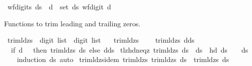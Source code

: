 \begin{isabellebody}
\ {\isachardoublequoteopen}wf{\isacharunderscore}{\kern0pt}digits\ ds\ {\isasymlongleftrightarrow}\ {\isacharparenleft}{\kern0pt}{\isasymforall}d\ {\isasymin}\ set\ ds{\isachardot}{\kern0pt}\ wf{\isacharunderscore}{\kern0pt}digit\ d{\isacharparenright}{\kern0pt}{\isachardoublequoteclose}%
\begin{isamarkuptext}%
Functions to trim leading and trailing zeros.%
\end{isamarkuptext}\isamarkuptrue%
\isamarkupfalse%
\ trim{\isacharunderscore}{\kern0pt}ld{\isacharunderscore}{\kern0pt}zs\ {\isacharcolon}{\kern0pt}{\isacharcolon}{\kern0pt}\ {\isachardoublequoteopen}digit\ list\ {\isasymRightarrow}\ digit\ list{\isachardoublequoteclose}\ \isanewline
\ \ {\isachardoublequoteopen}trim{\isacharunderscore}{\kern0pt}ld{\isacharunderscore}{\kern0pt}zs\ {\isacharbrackleft}{\kern0pt}{\isacharbrackright}{\kern0pt}\ {\isacharequal}{\kern0pt}\ {\isacharbrackleft}{\kern0pt}{\isacharbrackright}{\kern0pt}{\isachardoublequoteclose}\isanewline
{\isacharbar}{\kern0pt}\ {\isachardoublequoteopen}trim{\isacharunderscore}{\kern0pt}ld{\isacharunderscore}{\kern0pt}zs\ {\isacharparenleft}{\kern0pt}d{\isacharhash}{\kern0pt}ds{\isacharparenright}{\kern0pt}\ {\isacharequal}{\kern0pt}\ \isanewline
\ \ {\isacharparenleft}{\kern0pt}if\ d\ {\isacharequal}{\kern0pt}\ {}\ then\ trim{\isacharunderscore}{\kern0pt}ld{\isacharunderscore}{\kern0pt}zs\ ds\ else\ d{\isacharhash}{\kern0pt}ds{\isacharparenright}{\kern0pt}{\isachardoublequoteclose}\isanewline
\isanewline
{}\isamarkupfalse%
\ tlz{\isacharunderscore}{\kern0pt}hd{\isacharunderscore}{\kern0pt}neq{\isacharunderscore}{\kern0pt}z{\isacharcolon}{\kern0pt}\ {\isachardoublequoteopen}trim{\isacharunderscore}{\kern0pt}ld{\isacharunderscore}{\kern0pt}zs\ ds\ {\isacharequal}{\kern0pt}\ ds{\isacharprime}{\kern0pt}\ {\isasymLongrightarrow}\ hd\ ds{\isacharprime}{\kern0pt}\ {\isasymnoteq}\ {}\ {\isasymor}\ ds{\isacharprime}{\kern0pt}\ {\isacharequal}{\kern0pt}\ {\isacharbrackleft}{\kern0pt}{\isacharbrackright}{\kern0pt}{\isachardoublequoteclose}\isanewline
%
\isadelimproof
\ \ %
\endisadelimproof
%
\isatagproof
{}\isamarkupfalse%
\ {\isacharparenleft}{\kern0pt}induction\ ds{\isacharparenright}{\kern0pt}\ auto%
\endisatagproof
{\isafoldproof}%
%
\isadelimproof
\isanewline
%
\endisadelimproof
\isanewline
{}\isamarkupfalse%
\ trim{\isacharunderscore}{\kern0pt}ld{\isacharunderscore}{\kern0pt}zs{\isacharunderscore}{\kern0pt}idem{\isacharcolon}{\kern0pt}\ {\isachardoublequoteopen}trim{\isacharunderscore}{\kern0pt}ld{\isacharunderscore}{\kern0pt}zs\ {\isacharparenleft}{\kern0pt}trim{\isacharunderscore}{\kern0pt}ld{\isacharunderscore}{\kern0pt}zs\ ds{\isacharparenright}{\kern0pt}\ {\isacharequal}{\kern0pt}\ trim{\isacharunderscore}{\kern0pt}ld{\isacharunderscore}{\kern0pt}zs\ ds{\isachardoublequoteclose}\isanewline

\end{isabellebody}
